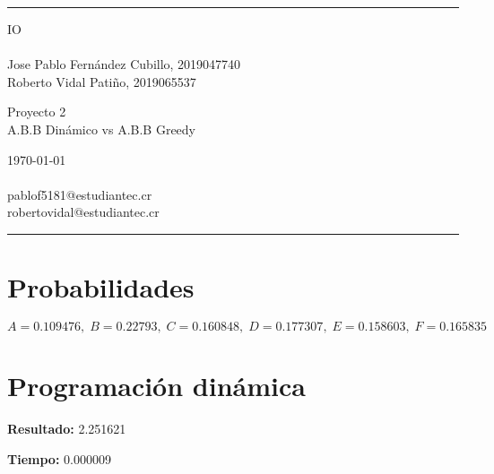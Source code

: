 \documentclass[a4paper]{article}
\begin{document}

\fancyhead[C]{}
\hrule \medskip %
\begin{minipage}{0.295\textwidth} %
\raggedright
IO\\ %
\footnotesize %
\hfill\\
Jose Pablo Fernández Cubillo, 2019047740 \\%
Roberto Vidal Patiño, 2019065537%
\end{minipage}
\begin{minipage}{0.4\textwidth} %
\centering 
\large %
Proyecto 2\\ %
\normalsize %
A.B.B Dinámico vs A.B.B Greedy\\ %
\end{minipage}
\begin{minipage}{0.295\textwidth} %
\raggedleft
\today\\ %
\footnotesize %
\hfill\\
pablof5181@estudiantec.cr\\
robertovidal@estudiantec.cr%
\end{minipage}
\medskip\hrule %
\bigskip

\section{Probabilidades}
$$A = 0.109476,\;B = 0.22793,\;C = 0.160848,\;D = 0.177307,\;E = 0.158603,\;F = 0.165835$$
\section{Programación dinámica}
\textbf{Resultado:} 2.251621

\textbf{Tiempo:} 0.000009
\end{document}
